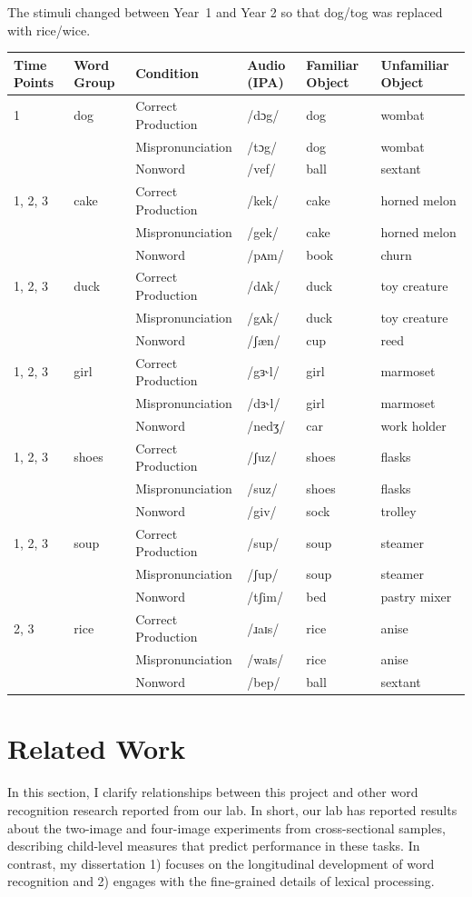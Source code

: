 \documentclass [11pt, proquest] {uwthesis}[2015/03/03]
\begin{document}
The stimuli changed between Year~1 and Year 2 so that dog/tog was
replaced with rice/wice.
\begin{longtable}[]{@{}llllll@{}}
\toprule
\textbf{Time Points} & \textbf{Word Group} & \textbf{Condition} &
\textbf{Audio (IPA)} & \textbf{Familiar Object} & \textbf{Unfamiliar
Object}\tabularnewline
\midrule
\endhead
1 & dog & Correct Production & /dɔg/ & dog & wombat\tabularnewline
& & Mispronunciation & /tɔg/ & dog & wombat\tabularnewline
& & Nonword & /vef/ & ball & sextant\tabularnewline
1, 2, 3 & cake & Correct Production & /kek/ & cake & horned
melon\tabularnewline
& & Mispronunciation & /gek/ & cake & horned melon\tabularnewline
& & Nonword & /pʌm/ & book & churn\tabularnewline
1, 2, 3 & duck & Correct Production & /dʌk/ & duck & toy
creature\tabularnewline
& & Mispronunciation & /gʌk/ & duck & toy creature\tabularnewline
& & Nonword & /ʃæn/ & cup & reed\tabularnewline
1, 2, 3 & girl & Correct Production & /gɜ˞l/ & girl &
marmoset\tabularnewline
& & Mispronunciation & /dɜ˞l/ & girl & marmoset\tabularnewline
& & Nonword & /nedʒ/ & car & work holder\tabularnewline
1, 2, 3 & shoes & Correct Production & /ʃuz/ & shoes &
flasks\tabularnewline
& & Mispronunciation & /suz/ & shoes & flasks\tabularnewline
& & Nonword & /giv/ & sock & trolley\tabularnewline
1, 2, 3 & soup & Correct Production & /sup/ & soup &
steamer\tabularnewline
& & Mispronunciation & /ʃup/ & soup & steamer\tabularnewline
& & Nonword & /tʃim/ & bed & pastry mixer\tabularnewline
2, 3 & rice & Correct Production & /ɹaɪs/ & rice & anise\tabularnewline
& & Mispronunciation & /waɪs/ & rice & anise\tabularnewline
& & Nonword & /bep/ & ball & sextant\tabularnewline
\bottomrule
\end{longtable}
\chapter{Related Work}\label{related-work}

In this section, I clarify relationships between this project and other
word recognition research reported from our lab. In short, our lab has
reported results about the two-image and four-image experiments from
cross-sectional samples, describing child-level measures that predict
performance in these tasks. In contrast, my dissertation 1) focuses on
the longitudinal development of word recognition and 2) engages with the
fine-grained details of lexical processing.
\end{document}
